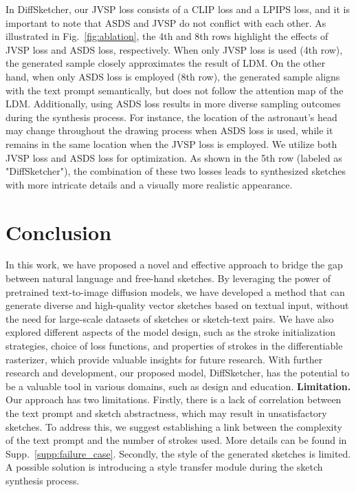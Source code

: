\documentclass{article}
\begin{document}
In DiffSketcher, our JVSP loss consists of a CLIP loss and a LPIPS loss, and it is important to note that ASDS and JVSP do not conflict with each other. As illustrated in Fig.~\ref{fig:ablation}, the 4th and 8th rows highlight the effects of JVSP loss and ASDS loss, respectively. When only JVSP loss is used (4th row), the generated sample closely approximates the result of LDM. On the other hand, when only ASDS loss is employed (8th row), the generated sample aligns with the text prompt semantically, but does not follow the attention map of the LDM. Additionally, using ASDS loss results in more diverse sampling outcomes during the synthesis process. For instance, the location of the astronaut's head may change throughout the drawing process when ASDS loss is used, while it remains in the same location when the JVSP loss is employed. We utilize both JVSP loss and ASDS loss for optimization. As shown in the 5th row (labeled as "DiffSketcher"), the combination of these two losses leads to synthesized sketches with more intricate details and a visually more realistic appearance.

\section{Conclusion}
In this work, we have proposed a novel and effective approach to bridge the gap between natural language and free-hand sketches. By leveraging the power of pretrained text-to-image diffusion models, we have developed a method that can generate diverse and high-quality vector sketches based on textual input, without the need for large-scale datasets of sketches or sketch-text pairs.
We have also explored different aspects of the model design, such as the stroke initialization strategies, choice of loss functions, and properties of strokes in the differentiable rasterizer, which provide valuable insights for future research.
With further research and development, our proposed model, DiffSketcher, has the potential to be a valuable tool in various domains, such as design and education.
\noindent\textbf{Limitation.} \quad
Our approach has two limitations. Firstly, there is a lack of correlation between the text prompt and sketch abstractness, which may result in unsatisfactory sketches. To address this, we suggest establishing a link between the complexity of the text prompt and the number of strokes used. More details can be found in Supp.~\ref{supp:failure_case}. Secondly, the style of the generated sketches is limited. A possible solution is introducing a style transfer module during the sketch synthesis process.
\end{document}
